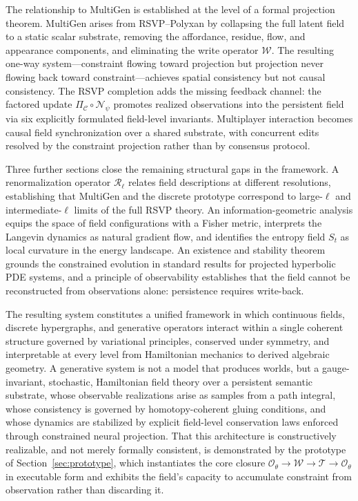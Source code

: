 \documentclass[11pt]{article}
\begin{document}
The relationship to MultiGen is established at the level of a formal
projection theorem.
MultiGen arises from RSVP--Polyxan by collapsing the full latent field to
a static scalar substrate, removing the affordance, residue, flow, and
appearance components, and eliminating the write operator $\mathcal{W}$.
The resulting one-way system---constraint flowing toward projection but
projection never flowing back toward constraint---achieves spatial
consistency but not causal consistency.
The RSVP completion adds the missing feedback channel: the factored update
$\Pi_{\mathcal{C}} \circ \mathcal{N}_\psi$ promotes realized observations
into the persistent field via six explicitly formulated field-level
invariants.
Multiplayer interaction becomes causal field synchronization over a shared
substrate, with concurrent edits resolved by the constraint projection
rather than by consensus protocol.

Three further sections close the remaining structural gaps in the framework.
A renormalization operator $\mathcal{R}_\ell$ relates field descriptions
at different resolutions, establishing that MultiGen and the discrete
prototype correspond to large-$\ell$ and intermediate-$\ell$ limits of
the full RSVP theory.
An information-geometric analysis equips the space of field configurations
with a Fisher metric, interprets the Langevin dynamics as natural gradient
flow, and identifies the entropy field $S_t$ as local curvature in the
energy landscape.
An existence and stability theorem grounds the constrained evolution in
standard results for projected hyperbolic PDE systems, and a principle of
observability establishes that the field cannot be reconstructed from
observations alone: persistence requires write-back.

The resulting system constitutes a unified framework in which continuous
fields, discrete hypergraphs, and generative operators interact within a
single coherent structure governed by variational principles, conserved
under symmetry, and interpretable at every level from Hamiltonian mechanics
to derived algebraic geometry.
A generative system is not a model that produces worlds, but a
gauge-invariant, stochastic, Hamiltonian field theory over a persistent
semantic substrate, whose observable realizations arise as samples from a
path integral, whose consistency is governed by homotopy-coherent gluing
conditions, and whose dynamics are stabilized by explicit field-level
conservation laws enforced through constrained neural projection.
That this architecture is constructively realizable, and not merely
formally consistent, is demonstrated by the prototype of
Section~\ref{sec:prototype}, which instantiates the core closure
$\mathcal{O}_\theta \to \mathcal{W} \to \mathcal{T} \to \mathcal{O}_\theta$
in executable form and exhibits the field's capacity to accumulate
constraint from observation rather than discarding it.
\end{document}
